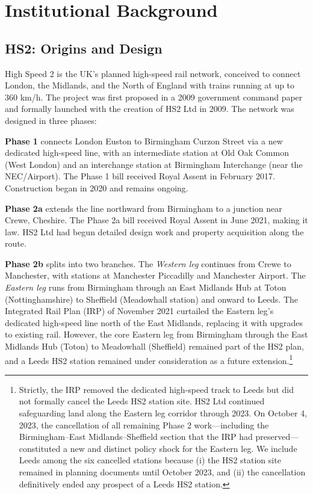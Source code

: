 \documentclass[12pt]{article}
\begin{document}
\section{Institutional Background}

\subsection{HS2: Origins and Design}

High Speed 2 is the UK's planned high-speed rail network, conceived to connect London, the Midlands, and the North of England with trains running at up to 360 km/h. The project was first proposed in a 2009 government command paper and formally launched with the creation of HS2 Ltd in 2009. The network was designed in three phases:

\textbf{Phase 1} connects London Euston to Birmingham Curzon Street via a new dedicated high-speed line, with an intermediate station at Old Oak Common (West London) and an interchange station at Birmingham Interchange (near the NEC/Airport). The Phase 1 bill received Royal Assent in February 2017. Construction began in 2020 and remains ongoing.

\textbf{Phase 2a} extends the line northward from Birmingham to a junction near Crewe, Cheshire. The Phase 2a bill received Royal Assent in June 2021, making it law. HS2 Ltd had begun detailed design work and property acquisition along the route.

\textbf{Phase 2b} splits into two branches. The \textit{Western leg} continues from Crewe to Manchester, with stations at Manchester Piccadilly and Manchester Airport. The \textit{Eastern leg} runs from Birmingham through an East Midlands Hub at Toton (Nottinghamshire) to Sheffield (Meadowhall station) and onward to Leeds. The Integrated Rail Plan (IRP) of November 2021 curtailed the Eastern leg's dedicated high-speed line north of the East Midlands, replacing it with upgrades to existing rail. However, the core Eastern leg from Birmingham through the East Midlands Hub (Toton) to Meadowhall (Sheffield) remained part of the HS2 plan, and a Leeds HS2 station remained under consideration as a future extension.\footnote{Strictly, the IRP removed the dedicated high-speed track to Leeds but did not formally cancel the Leeds HS2 station site. HS2 Ltd continued safeguarding land along the Eastern leg corridor through 2023. On October 4, 2023, the cancellation of all remaining Phase 2 work---including the Birmingham--East Midlands--Sheffield section that the IRP had preserved---constituted a new and distinct policy shock for the Eastern leg. We include Leeds among the six cancelled stations because (i) the HS2 station site remained in planning documents until October 2023, and (ii) the cancellation definitively ended any prospect of a Leeds HS2 station.}
\end{document}
